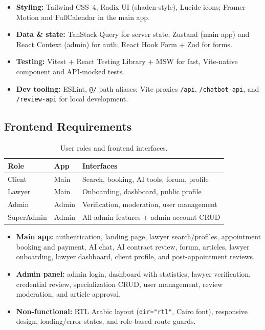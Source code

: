 \begin{itemize}
    \item \textbf{Styling:} Tailwind CSS~4, Radix UI (shadcn-style), Lucide icons; Framer Motion and FullCalendar in the main app.
    \item \textbf{Data \& state:} TanStack Query for server state; Zustand (main app) and React Context (admin) for auth; React Hook Form + Zod for forms.
    \item \textbf{Testing:} Vitest + React Testing Library + MSW for fast, Vite-native component and API-mocked tests.
    \item \textbf{Dev tooling:} ESLint, \texttt{@/} path aliases; Vite proxies \texttt{/api}, \texttt{/chatbot-api}, and \texttt{/review-api} for local development.
\end{itemize}

\subsection{Frontend Requirements}

\begin{table}[H]
    \centering
    \caption{User roles and frontend interfaces.}
    \label{tab:user-roles}
    \begin{tabular}{lll}
        \hline
        \textbf{Role} & \textbf{App} & \textbf{Interfaces} \\
        \hline
        Client     & Main  & Search, booking, AI tools, forum, profile \\
        Lawyer     & Main  & Onboarding, dashboard, public profile \\
        Admin      & Admin & Verification, moderation, user management \\
        SuperAdmin & Admin & All admin features + admin account CRUD \\
        \hline
    \end{tabular}
\end{table}

\begin{itemize}
    \item \textbf{Main app:} authentication, landing page, lawyer search/profiles, appointment booking and payment, AI chat, AI contract review, forum, articles, lawyer onboarding, lawyer dashboard, client profile, and post-appointment reviews.
    \item \textbf{Admin panel:} admin login, dashboard with statistics, lawyer verification, credential review, specialization CRUD, user management, review moderation, and article approval.
    \item \textbf{Non-functional:} RTL Arabic layout (\texttt{dir="rtl"}, Cairo font), responsive design, loading/error states, and role-based route guards.
\end{itemize}

